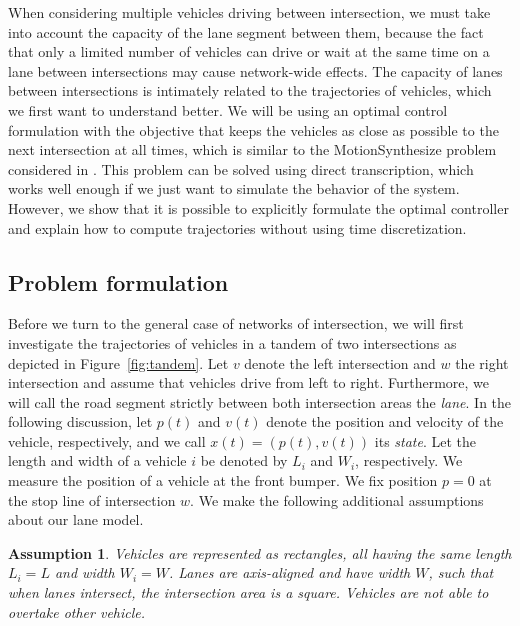 \documentclass[a4paper]{article}
\theoremstyle{definition}
\theoremstyle{plain}
\newtheorem{assump}{Assumption\hspace{0.25em}\ignorespaces}
\begin{document}
When considering multiple vehicles driving between intersection, we must take
into account the capacity of the lane segment between them, because the fact
that only a limited number of vehicles can drive or wait at the same time on a
lane between intersections may cause network-wide effects.
%
The capacity of lanes between intersections is intimately related to the
trajectories of vehicles, which we first want to understand better. We will be
using an optimal control formulation with the objective that keeps the vehicles
as close as possible to the next intersection at all times, which is similar to
the MotionSynthesize problem considered in
\cite{miculescuPollingsystemsbasedAutonomousVehicle2016}. This problem can be
solved using direct transcription, which works well enough if we just want to
simulate the behavior of the system. However, we show that it is possible to
explicitly formulate the optimal controller and explain how to compute
trajectories without using time discretization.

\subsection{Problem formulation}

Before we turn to the general case of networks of intersection, we will first
investigate the trajectories of vehicles in a tandem of two intersections as
depicted in Figure~\ref{fig:tandem}. Let $v$ denote the left intersection and
$w$ the right intersection and assume that vehicles drive from left to right.
Furthermore, we will call the road segment strictly between both intersection
areas the \textit{lane}. In the following discussion, let $p(t)$ and $v(t)$ denote the
position and velocity of the vehicle, respectively, and we call
$x(t) = (p(t), v(t))$ its \textit{state}. Let the length and width of a vehicle
$i$ be denoted by $L_{i}$ and $W_{i}$, respectively. We measure the position of
a vehicle at the front bumper. We fix position $p=0$ at the stop line of
intersection $w$.
%
We make the following additional assumptions about our lane model.

\begin{assump}
  \label{assump:same_geometry}
  Vehicles are represented as rectangles, all having the same length $L_{i} = L$
  and width $W_{i} = W$. Lanes are axis-aligned and have width $W$, such that
  when lanes intersect, the intersection area is a square.
  Vehicles are not able to overtake other vehicle.
\end{assump}
\end{document}
